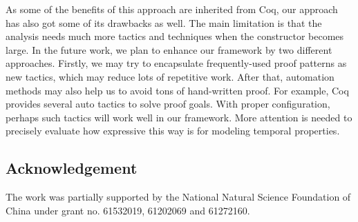 \documentclass[preprint,3p]{elsarticle}
\begin{document}
As some of the benefits of this approach are inherited from Coq, our approach has also got some of its drawbacks as well.
The main limitation is that the analysis needs much more tactics and techniques when the constructor becomes large.
In the future work, we plan to enhance our framework by two different approaches. Firstly, we may try to encapsulate
frequently-used proof patterns as new tactics, which may reduce lots of repetitive work. After that, automation methods
may also help us to avoid tons of hand-written proof. For example, Coq provides several auto tactics to solve proof
goals. With proper configuration, perhaps such tactics will work well in our framework. More attention is needed to precisely
evaluate how expressive this way is for modeling temporal properties.

\subsection*{Acknowledgement}
\noindent The work was partially supported by the National Natural Science Foundation of China under grant no. 61532019, 61202069 and 61272160.

%


\end{document}
